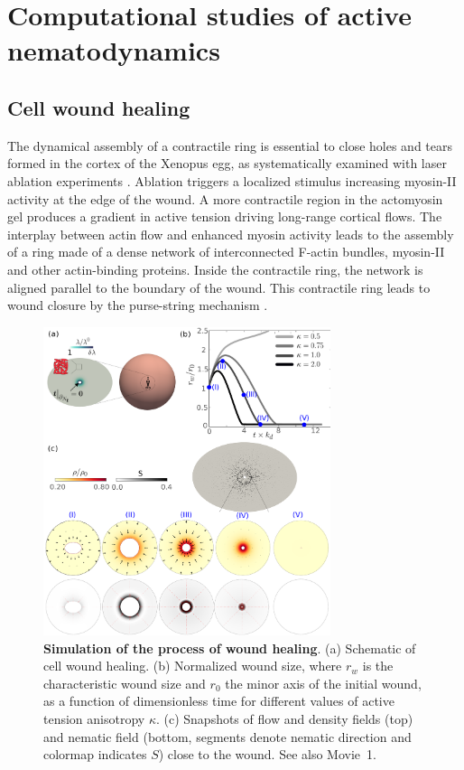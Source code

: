 \documentclass[12pt]{iopart}
\begin{document}
	\section{Computational studies of active nematodynamics}\label{sec_5}
	
	\subsection{Cell wound healing}
	\label{ex1}
	
	The dynamical assembly of a contractile ring is essential to close holes and tears formed in the cortex of the Xenopus egg, as systematically examined with laser ablation experiments \cite{benink2000,mandato2001}. Ablation triggers a localized stimulus increasing myosin-II activity at the edge of the wound. A more contractile region in the actomyosin gel produces a gradient in active tension driving long-range cortical flows. The interplay between actin flow and enhanced myosin activity leads to the assembly of a ring made of a dense network of interconnected F-actin bundles, myosin-II and other actin-binding proteins. Inside the contractile ring, the network is aligned parallel to the boundary of the wound. This contractile ring leads to wound closure by the purse-string mechanism \cite{Alice2008}.
	
	
	\begin{figure}[t]
		\centering
		\includegraphics[width=0.75\textwidth]{fig1.pdf}
		\caption{\label{sec_1_chap_3_fig_1} \textbf{Simulation of the process of wound healing}. (a) Schematic of cell wound healing. (b) Normalized wound size, where $r_w$ is the characteristic wound size and $r_0$ the minor axis of the initial wound, as a function of dimensionless time for different values of active tension anisotropy $\kappa$. (c) Snapshots of flow and density fields (top) and nematic field (bottom, segments denote nematic direction and colormap indicates $S$) close to the wound. See also Movie~1.}	
	\end{figure}
	
\end{document}
